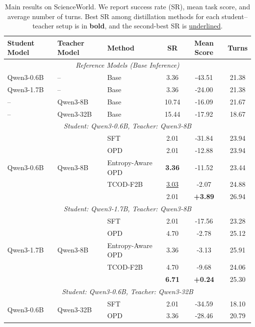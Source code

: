 \begin{table}[t]
\centering
\caption{Main results on ScienceWorld. We report success rate (SR), mean task score, and average number of turns. Best SR among distillation methods for each student--teacher setup is in \textbf{bold}, and the second-best SR is \underline{underlined}.}
\label{tab:main_results_scienceworld}
\begin{tabular}{lllccc}
\toprule
\textbf{Student Model} & \textbf{Teacher Model} & \textbf{Method}
& \textbf{SR} & \textbf{Mean Score} & \textbf{Turns} \\
\midrule
\multicolumn{6}{c}{\textit{Reference Models (Base Inference)}} \\
\midrule
Qwen3-0.6B & -- & Base & 3.36 & -43.51 & 21.38 \\
Qwen3-1.7B & -- & Base & 3.36 & -24.00 & 21.38 \\
-- & Qwen3-8B & Base & 10.74 & -16.09 & 21.67 \\
-- & Qwen3-32B & Base & 15.44 & -17.92 & 18.67 \\
\midrule
\multicolumn{6}{c}{\textit{Student: Qwen3-0.6B, Teacher: Qwen3-8B}} \\
\midrule
\multirow{5}{*}{Qwen3-0.6B} & \multirow{5}{*}{Qwen3-8B} & SFT & 2.01 & -31.84 & 23.94 \\
 & & OPD & 2.01 & -12.88 & 23.94 \\
 & & Entropy-Aware OPD & \textbf{3.36} & -11.52 & 23.44 \\
 & & TCOD-F2B & \underline{3.03} & -2.07 & 24.88 \\
 & & \ours{} & 2.01 & \textbf{+3.89} & 26.94 \\
\midrule
\multicolumn{6}{c}{\textit{Student: Qwen3-1.7B, Teacher: Qwen3-8B}} \\
\midrule
\multirow{5}{*}{Qwen3-1.7B} & \multirow{5}{*}{Qwen3-8B} & SFT & 2.01 & -17.56 & 23.28 \\
 & & OPD & 4.70 & -2.78 & 25.12 \\
 & & Entropy-Aware OPD & 3.36 & -3.13 & 25.91 \\
 & & TCOD-F2B & 4.70 & -9.68 & 24.06 \\
 & & \ours{} & \textbf{6.71} & \textbf{+0.24} & 25.30 \\
\midrule
\multicolumn{6}{c}{\textit{Student: Qwen3-0.6B, Teacher: Qwen3-32B}} \\
\midrule
\multirow{5}{*}{Qwen3-0.6B} & \multirow{5}{*}{Qwen3-32B} & SFT & 2.01 & -34.59 & 18.10 \\
 & & OPD & 3.36 & -28.46 & 20.79 \\

\end{tabular}
\end{table}
